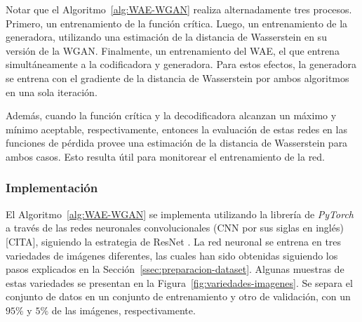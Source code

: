 Notar que el Algoritmo~\ref{alg:WAE-WGAN} realiza alternadamente tres procesos. Primero, un entrenamiento de la función crítica. Luego, un entrenamiento de la generadora, utilizando una estimación de la distancia de Wasserstein en su versión de la WGAN. Finalmente, un entrenamiento del WAE, el que entrena simultáneamente a la codificadora y generadora. Para estos efectos, la generadora se entrena con el gradiente de la distancia de Wasserstein por ambos algoritmos en una sola iteración.


Además, cuando la función crítica y la decodificadora alcanzan un máximo y mínimo aceptable, respectivamente, entonces la evaluación de estas redes en las funciones de pérdida provee una estimación de la distancia de Wasserstein para ambos casos. Esto resulta útil para monitorear el entrenamiento de la red.

\subsubsection{Implementación}\label{sssec:wae-wgan-implementacion}  %


El Algoritmo~\ref{alg:WAE-WGAN} se implementa utilizando la librería de \textit{PyTorch} \cite{paszke2019pytorch} a través de las redes neuronales convolucionales (CNN por sus siglas en inglés) [CITA], siguiendo la estrategia de ResNet \cite{he2016deep}. La red neuronal se entrena en tres variedades de imágenes diferentes, las cuales han sido obtenidas siguiendo los pasos explicados en la Sección~\ref{ssec:preparacion-dataset}. Algunas muestras de estas variedades se presentan en la Figura~\ref{fig:variedades-imagenes}. Se separa el conjunto de datos en un conjunto de entrenamiento y otro de validación, con un $95\%$ y $5\%$ de las imágenes, respectivamente.

